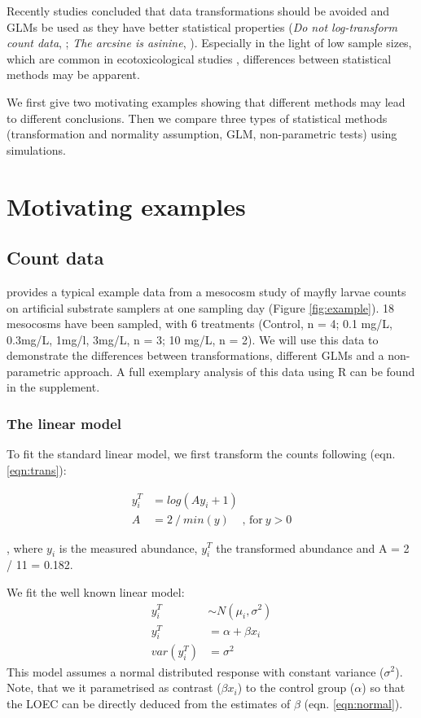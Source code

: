 \documentclass{scrartcl}
\begin{document}
Recently studies concluded that data transformations should be avoided and GLMs be used as they have better statistical properties (\emph{Do not log-transform count data}, \citep{ohara_not_2010}; \emph{The arcsine is asinine}, \citep{warton_arcsine_2011}).
Especially in the light of low sample sizes, which are common in ecotoxicological studies \citep{sanderson_pesticide_2002,szocs_analysing_2015}, differences between statistical methods may be apparent. 

We first give two motivating examples showing that different methods may lead to different conclusions. 
Then we compare three types of statistical methods (transformation and normality assumption, GLM, non-parametric tests) using simulations.


\section{Motivating examples}
\subsection{Count data}
\citet{brock_minimum_2014} provides a typical example data from a mesocosm study of mayfly larvae counts on artificial substrate samplers at one sampling day (Figure \ref{fig:example}). 
18 mesocosms have been sampled, with 6 treatments (Control, n = 4; 0.1 mg/L, 0.3mg/L, 1mg/l, 3mg/L, n = 3; 10 mg/L, n = 2).
We will use this data to demonstrate the differences between transformations, different GLMs and a non-parametric approach.
A full exemplary analysis of this data using R \citep{r_core_team_r:_2014} can be found in the supplement.


\subsubsection{The linear model}
To fit the standard linear model, we first transform the counts following \citet{van_den_brink_impact_2000} (eqn. \ref{eqn:trans}):

\begin{align}
  y^T_i & = log(Ay_i + 1) \label{eqn:trans} \\
  A & = 2~/~min(y)~~~~~\text{, for}~ y > 0 \nonumber
\end{align}

, where $y_i$ is the measured abundance, $y_i^T$ the transformed abundance and A = 2 / 11 = 0.182.

We fit the well known linear model:
\begin{align}
  y_i^T &\sim N(\mu_i, \sigma^2) \nonumber \\
  y_i^T &= \alpha + \beta x_i \label{eqn:normal} \\
  var(y_i^T) &= \sigma^2 \nonumber
\end{align}
This model assumes a normal distributed response with constant variance ($\sigma^2$).
Note, that we it parametrised as contrast ($\beta x_i$) to the control group ($\alpha$) so that the LOEC can be directly deduced from the estimates of $\beta$ (eqn. \ref{eqn:normal}).
\end{document}
